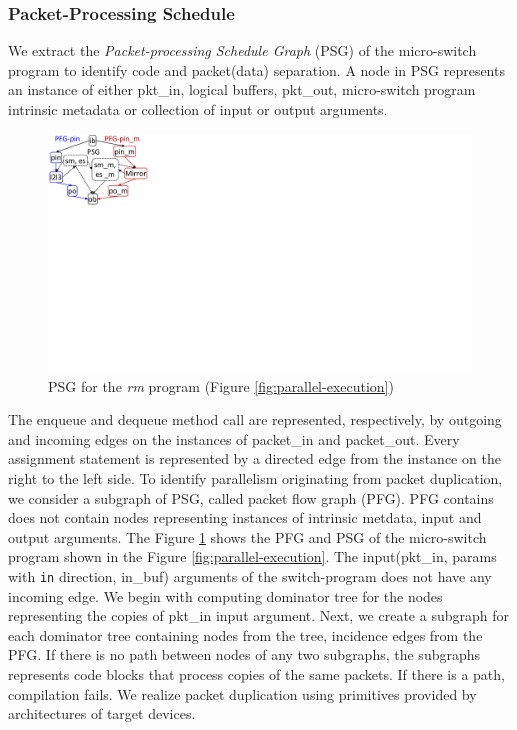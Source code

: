 \documentclass{hotnets19}
\begin{document}
\subsubsection{Packet-Processing Schedule}
We extract the \emph{Packet-processing Schedule Graph} (PSG) of the micro-switch program to identify code and packet(data) separation.
A node in PSG represents an instance of either pkt\_in, logical buffers, pkt\-\_out, micro-switch program intrinsic metadata or collection of input or output arguments.
\begin{figure}[!h]
    \centering
    \includegraphics[trim=0 370 735 0, clip, scale=0.5]{psg}
    \caption{PSG for the \emph{rm} program (Figure \ref{fig:parallel-execution})}
    \label{fig:graph}
\end{figure}
The enqueue and dequeue method call are represented, respectively, by outgoing and incoming edges on the instances of packet\_in and packet\_out.
Every assignment statement is represented by a directed edge from the instance on the right to the left side.
To identify parallelism originating from packet duplication, we consider a subgraph of PSG, called packet flow graph (PFG).
PFG contains does not contain nodes representing instances of intrinsic metdata, input and output arguments.
The Figure \ref{fig:graph} shows the PFG and PSG of the micro-switch program shown in the Figure \ref{fig:parallel-execution}.
The input(pkt\_in, params with \texttt{in} direction, in\_buf) arguments of the switch-program does not have any incoming edge.
We begin with computing dominator tree for the nodes representing the copies of pkt\_in input argument.
Next, we create a subgraph for each dominator tree containing nodes from the tree, incidence edges from the PFG.
If there is no path between nodes of any two subgraphs, the subgraphs represents code blocks that process copies of the same packets.
If there is a path, compilation fails.
We realize packet duplication using primitives provided by architectures of target devices.
\end{document}
